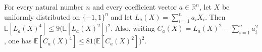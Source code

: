 \begin{theorem}
\label{FABL.linearForm_and_centeredSquare_fourthMoment}
\leanok
{}
For every natural number $n$ and every coefficient vector $a\in\mathbb{R}^n$, let $X$ be
uniformly distributed on $\{-1,1\}^n$ and let $L_a(X)=\sum_{i=1}^n a_iX_i$. Then
$\mathbb{E}[L_a(X)^4]\le 9\bigl(\mathbb{E}[L_a(X)^2]\bigr)^2$. Also, writing
$C_a(X)=L_a(X)^2-\sum_{i=1}^n a_i^2$, one has $\mathbb{E}[C_a(X)^4]\le
81\bigl(\mathbb{E}[C_a(X)^2]\bigr)^2$.
\end{theorem}

